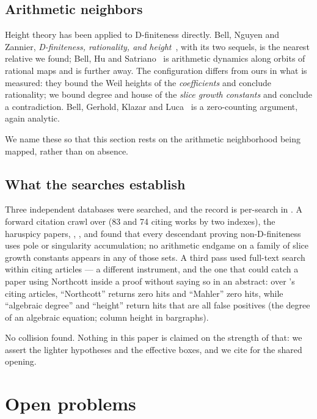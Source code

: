 \documentclass[11pt]{article}
\begin{document}
\subsection{Arithmetic neighbors}

Height theory has been applied to D-finiteness directly. Bell, Nguyen and
Zannier, \emph{D-finiteness, rationality, and height}~\cite{bnz2020}, with its
two sequels, is the nearest relative we found; Bell, Hu and
Satriano~\cite{bhs2020} is arithmetic dynamics along orbits of rational maps and
is further away. The configuration differs from ours in what is measured: they
bound the Weil heights of the \emph{coefficients} and conclude rationality; we
bound degree and house of the \emph{slice growth constants} and conclude a
contradiction. Bell, Gerhold, Klazar and Luca~\cite{bgkl2008} is a
zero-counting argument, again analytic.

We name these so that this section rests on the arithmetic neighborhood being
mapped, rather than on absence.

\subsection{What the searches establish}

Three independent databases were searched, and the record is per-search in
. A forward citation crawl over
\cite{bmr2002} (83 and 74 citing works by two indexes), the haruspicy
papers, \cite{chanRechnitzer2018}, \cite{bbo2021}, \cite{bhs2020} and
\cite{bgkl2008} found that every descendant proving non-D-finiteness uses pole or
singularity accumulation; no arithmetic endgame on a family of slice growth
constants appears in any of those sets. A third pass used full-text search within
citing articles --- a different instrument, and the one that could catch
a paper using Northcott inside a proof without saying so in an abstract: over
\cite{bmr2002}'s citing articles, ``Northcott'' returns zero hits and ``Mahler''
zero hits, while ``algebraic degree'' and ``height'' return hits that are all
false positives (the degree of an algebraic equation; column height in
bargraphs).

No collision found. Nothing in this paper is claimed on the strength of that:
we assert the lighter hypotheses and the effective boxes, and we cite
\cite[Lemma~9]{bmr2002} for the shared opening.

\section{Open problems}
\end{document}
